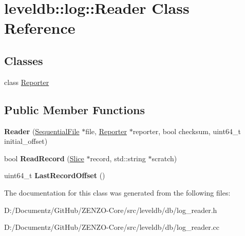 \hypertarget{classleveldb_1_1log_1_1_reader}{}\section{leveldb\+::log\+::Reader Class Reference}
\label{classleveldb_1_1log_1_1_reader}
\subsection*{Classes}
\begin{DoxyCompactItemize}
\item 
class \mbox{\hyperlink{classleveldb_1_1log_1_1_reader_1_1_reporter}{Reporter}}
\end{DoxyCompactItemize}
\subsection*{Public Member Functions}
\begin{DoxyCompactItemize}
\item 
\mbox{\label{classleveldb_1_1log_1_1_reader_a38c1a9988741af5429dad60cf79f0556}} 
{\bfseries Reader} (\mbox{\hyperlink{classleveldb_1_1_sequential_file}{Sequential\+File}} $\ast$file, \mbox{\hyperlink{classleveldb_1_1log_1_1_reader_1_1_reporter}{Reporter}} $\ast$reporter, bool checksum, uint64\+\_\+t initial\+\_\+offset)
\item 
\mbox{\label{classleveldb_1_1log_1_1_reader_a84059598c9367cb677a9d70d77993282}} 
bool {\bfseries Read\+Record} (\mbox{\hyperlink{classleveldb_1_1_slice}{Slice}} $\ast$record, std\+::string $\ast$scratch)
\item 
\mbox{\label{classleveldb_1_1log_1_1_reader_a358c5545069d86a61948ac0a021aa7f6}} 
uint64\+\_\+t {\bfseries Last\+Record\+Offset} ()
\end{DoxyCompactItemize}


The documentation for this class was generated from the following files\+:\begin{DoxyCompactItemize}
\item 
D\+:/\+Documentz/\+Git\+Hub/\+Z\+E\+N\+Z\+O-\/\+Core/src/leveldb/db/log\+\_\+reader.\+h\item 
D\+:/\+Documentz/\+Git\+Hub/\+Z\+E\+N\+Z\+O-\/\+Core/src/leveldb/db/log\+\_\+reader.\+cc\end{DoxyCompactItemize}
